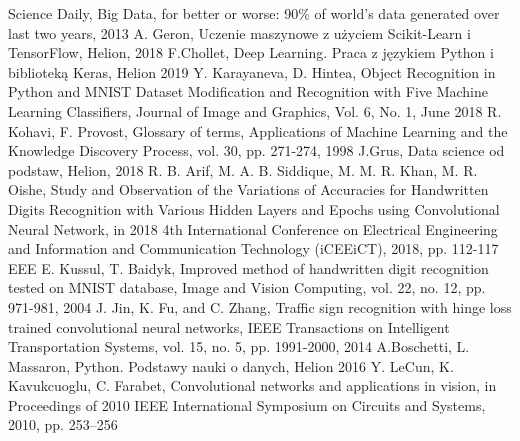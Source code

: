 \documentclass{article}
\begin{document}
\newpage %
\renewcommand\refname{\section*{Bibliografia}}
\begin{thebibliography}{11}\linespread{1}\normalsize{
	Science Daily, Big Data, for better or worse: 90\% of world’s data generated over last two years, 2013
	A. Geron, Uczenie maszynowe z użyciem Scikit-Learn i TensorFlow, Helion, 2018
	F.Chollet, Deep Learning. Praca z językiem Python i biblioteką Keras, Helion 2019
	Y. Karayaneva, D. Hintea, Object Recognition in Python and MNIST Dataset Modification and Recognition with Five Machine Learning Classifiers, Journal of Image and Graphics, Vol. 6, No. 1, June 2018
	R.  Kohavi, F.  Provost, Glossary  of  terms, Applications  of Machine Learning and the Knowledge Discovery Process, vol. 30, pp. 271-274, 1998
	J.Grus, Data science od podstaw, Helion, 2018
	R. B. Arif, M. A. B. Siddique, M. M. R. Khan, M. R. Oishe, Study  and  Observation  of  the  Variations  of  Accuracies  for Handwritten  Digits  Recognition  with  Various  Hidden  Layers and Epochs using Convolutional Neural Network, in 2018 4th International  Conference  on  Electrical  Engineering  and Information  and  Communication  Technology  (iCEEiCT),  2018, pp. 112-117 EEE
	E. Kussul, T. Baidyk, Improved method of handwritten digit recognition  tested  on  MNIST  database,  Image  and  Vision Computing, vol. 22, no. 12, pp. 971-981, 2004
	J. Jin, K. Fu, and C. Zhang, Traffic sign recognition with hinge loss trained convolutional neural networks, IEEE Transactions on Intelligent Transportation Systems, vol. 15, no. 5, pp. 1991-2000, 2014
	A.Boschetti, L. Massaron, Python. Podstawy nauki o danych, Helion 2016
	Y.  LeCun,  K.  Kavukcuoglu, C.  Farabet, Convolutional  networks  and  applications  in  vision, in Proceedings of 2010 IEEE International Symposium on Circuits and Systems, 2010, pp. 253–256
}
\end{thebibliography}
\end{document}
